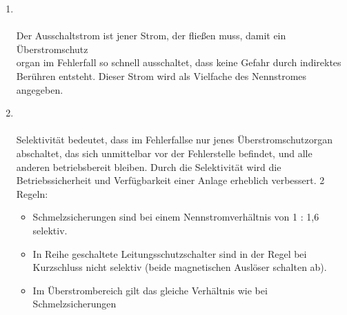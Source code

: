 \begin{enumerate}
    \item   {} \\\\
            Der Ausschaltstrom ist jener Strom, der fließen muss, damit ein Überstromschutz\\organ im Fehlerfall so schnell ausschaltet, dass keine Gefahr durch indirektes Berühren entsteht.
            Dieser Strom wird als Vielfache des Nennstromes angegeben.

    \item   {} \\\\
            Selektivität bedeutet, dass im Fehlerfallse nur jenes Überstromschutzorgan abschaltet, das sich unmittelbar vor der Fehlerstelle befindet, und alle anderen betriebsbereit bleiben.
            Durch die Selektivität wird die Betriebssicherheit und Verfügbarkeit einer Anlage erheblich verbessert.
            2 Regeln: 

            \begin{itemize}
                \item Schmelzsicherungen sind bei einem Nennstromverhältnis von 1 : 1,6 selektiv.
                \item In Reihe geschaltete Leitungsschutzschalter sind in der Regel bei Kurzschluss nicht selektiv (beide magnetischen Auslöser schalten ab).  
                \item Im Überstrombereich gilt das gleiche Verhältnis wie bei Schmelzsicherungen
            \end{itemize}
\end{enumerate}